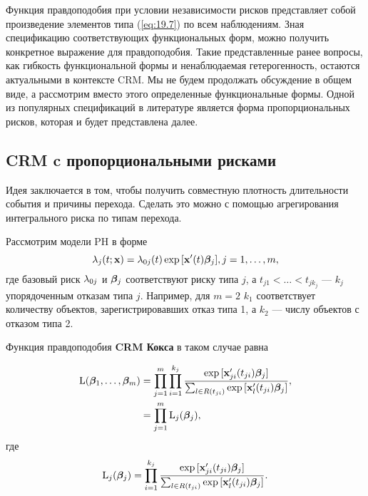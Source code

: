 Функция правдоподобия при условии независимости рисков представляет собой произведение элементов типа (\ref{eq:19.7}) по всем наблюдениям. Зная спецификацию соответствующих функциональных форм, можно получить конкретное выражение для правдоподобия. Такие представленные ранее вопросы, как гибкость функциональной формы и ненаблюдаемая гетерогенность, остаются актуальными в контексте CRM. Мы не будем продолжать обсуждение в общем виде, а рассмотрим вместо этого определенные функциональные формы. Одной из популярных спецификаций в литературе является форма пропорциональных рисков, которая и будет представлена далее.


\subsection{CRM c пропорциональными рисками}\label{sec:19.2.2}

\noindent
Идея заключается в том, чтобы получить совместную плотность длительности события и причины перехода. Сделать это можно с помощью агрегирования интегрального риска по типам перехода.

Рассмотрим модели PH в форме
    $$\lambda_j(t;\mathbf{x}) = \lambda_{0j}(t) \exp{[\mathbf{x}'(t) \bm{\beta}_j]}, j = 1,\ldots ,m,$$
где базовый риск $\lambda_{0j}$ и $\bm{\beta}_j$ соответствуют риску типа $j$, а $t_{j1} < \ldots  < t_{jk_j}$ --- $k_j$ упорядоченным отказам типа $j$. Например, для $m = 2$ $k_1$ соответствует количеству объектов, зарегистрировавших отказ типа 1, а $k_2$ --- числу объектов с отказом типа 2.

Функция правдоподобия \textbf{CRM Кокса} в таком случае равна

    \begin{align}
    \label{eq:19.10}
    \mathrm{L}(\bm{\beta}_1,\ldots ,\bm{\beta}_m) &= \prod_{j=1}^{m} \prod_{i=1}^{k_j} \frac{\exp{[\mathbf{x}'_{ji}(t_{ji}) \bm{\beta}_j]}}{\sum_{l \in R(t_{ji})} \exp{[\mathbf{x}'_l(t_{ji})\bm{\beta}_j]}}, \\
    &= \prod_{j=1}^{m} \mathrm{L}_j(\bm{\beta}_j), \notag
    \end{align}
где
    \begin{align}
    \label{eq:19.11}
    \mathrm{L}_j(\bm{\beta}_j) = \prod_{i=1}^{k_j} \frac{\exp{[\mathbf{x}'_{ji}(t_{ji}) \bm{\beta}_j]}}{\sum_{l \in R(t_{ji})} \exp{[\mathbf{x}'_l(t_{ji})\bm{\beta}_j]}}.
    \end{align}
    
